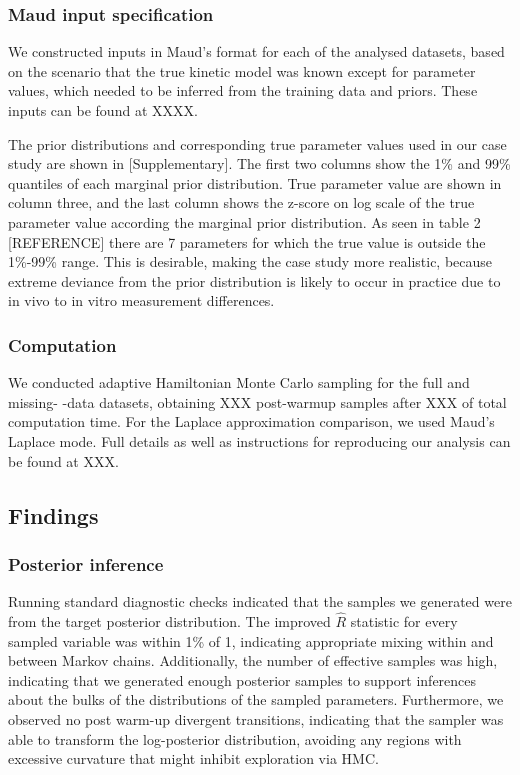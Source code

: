 \documentclass[journal=,manuscript=]{achemso}
\begin{document}
\hypertarget{maud-input-specification}{%
\subsubsection{Maud input
specification}\label{maud-input-specification}}

We constructed inputs in Maud's format for each of the analysed
datasets, based on the scenario that the true kinetic model was known
except for parameter values, which needed to be inferred from the
training data and priors. These inputs can be found at XXXX.

The prior distributions and corresponding true parameter values used in
our case study are shown in {[}Supplementary{]}. The first two columns
show the 1\% and 99\% quantiles of each marginal prior distribution.
True parameter value are shown in column three, and the last column
shows the z-score on log scale of the true parameter value according the
marginal prior distribution. As seen in table 2 {[}REFERENCE{]} there
are 7 parameters for which the true value is outside the 1\%-99\% range.
This is desirable, making the case study more realistic, because extreme
deviance from the prior distribution is likely to occur in practice due
to in vivo to in vitro measurement differences.

\hypertarget{computation}{%
\subsubsection{Computation}\label{computation}}

We conducted adaptive Hamiltonian Monte Carlo sampling for the full and
missing- -data datasets, obtaining XXX post-warmup samples after XXX of
total computation time. For the Laplace approximation comparison, we
used Maud's Laplace mode. Full details as well as instructions for
reproducing our analysis can be found at XXX.

\hypertarget{findings}{%
\subsection{Findings}\label{findings}}

\hypertarget{posterior-inference}{%
\subsubsection{Posterior inference}\label{posterior-inference}}

Running standard diagnostic checks indicated that the samples we
generated were from the target posterior distribution. The improved
\(\hat{R}\) statistic
\citep{vehtariRankNormalizationFoldingLocalization2021} for every
sampled variable was within 1\% of 1, indicating appropriate mixing
within and between Markov chains. Additionally, the number of effective
samples was high, indicating that we generated enough posterior samples
to support inferences about the bulks of the distributions of the
sampled parameters. Furthermore, we observed no post warm-up divergent
transitions, indicating that the sampler was able to transform the
log-posterior distribution, avoiding any regions with excessive
curvature that might inhibit exploration via HMC.
\end{document}
